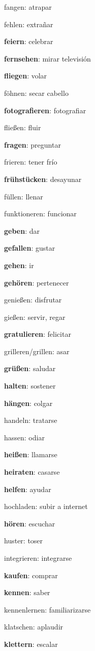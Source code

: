\begin{multicols}{2}
\begin{myitemize}
\item fangen: atrapar
\item fehlen: extrañar
\item \textbf{feiern}: celebrar
\item \textbf{fernsehen}: mirar televisión
\item \textbf{fliegen}: volar
\item föhnen: secar cabello
\item \textbf{fotografieren}: fotografiar
\item fließen: fluir
\item \textbf{fragen}: preguntar
\item frieren: tener frío
\item \textbf{frühstücken}: desayunar
\item füllen: llenar
\item funktioneren: funcionar
\item \textbf{geben}: dar
\item \textbf{gefallen}: gustar
\item \textbf{gehen}: ir
\item \textbf{gehören}: pertenecer
\item genießen: disfrutar
\item gießen: servir, regar
\item \textbf{gratulieren}: felicitar
\item grilleren/grillen: asar
\item \textbf{grüßen}: saludar
\item \textbf{halten}: sostener
\item \textbf{hängen}: colgar
\item handeln: tratarse
\item hassen: odiar
\item \textbf{heißen}: llamarse
\item \textbf{heiraten}: casarse
\item \textbf{helfen}: ayudar
\item hochladen: subir a internet
\item \textbf{hören}: escuchar
\item huster: toser
\item integrieren: integrarse
\item \textbf{kaufen}: comprar
\item \textbf{kennen}: saber
\item kennenlernen: familiarizarse
\item klatschen: aplaudir
\item \textbf{klettern}: escalar

\end{myitemize}
\end{multicols}
